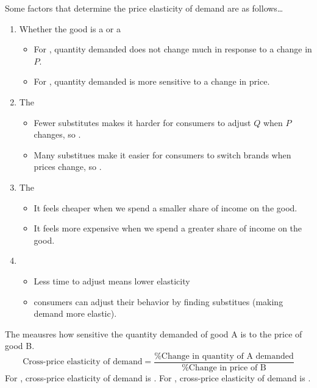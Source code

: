 \documentclass{article}
\begin{document}
Some factors that determine the price elasticity of demand are as follows\dots 
\begin{enumerate}
  \item Whether the good is a  or a 
    \begin{itemize}
      \item For , quantity demanded does not change much in response to a change in $P$. 
      \item For , quantity demanded is more sensitive to a change in price. 
    \end{itemize}
  \item The 
    \begin{itemize}
      \item Fewer substitutes makes it harder for consumers to adjust $Q$ when $P$ changes, so . 
      \item Many substitues make it easier for consumers to switch brands when prices change, so .
    \end{itemize}
  \item The  
    \begin{itemize}
      \item It feels cheaper when we spend a smaller share of income on the good. 
      \item It feels more expensive when we spend a greater share of income on the good. 
    \end{itemize}
  \item {}
    \begin{itemize}
      \item Less time to adjust means lower elasticity 
      \item {} consumers can adjust their behavior by finding substitues (making demand more elastic).
    \end{itemize}
\end{enumerate}

The  meausres how sensitive the quantity demanded of good A is to the price of good B. $$\textrm{Cross-price elasticity of demand} = \frac{\textrm{\% Change in quantity of A demanded}}{\textrm{\% Change in price of B}}$$ For , cross-price elasticity of demand is . For , cross-price elasticity of demand is .
\end{document}
